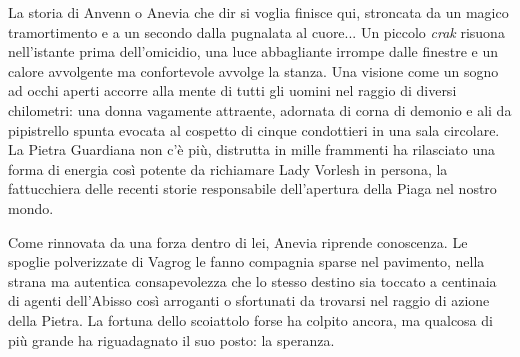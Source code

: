 La storia di Anvenn o Anevia che dir si voglia finisce qui, stroncata da un magico tramortimento e a un secondo dalla pugnalata al cuore... Un piccolo \emph{crak} risuona nell'istante prima dell'omicidio, una luce abbagliante irrompe dalle finestre e un calore avvolgente ma confortevole avvolge la stanza. Una visione come un sogno ad occhi aperti accorre alla mente di tutti gli uomini nel raggio di diversi chilometri: una donna vagamente attraente, adornata di corna di demonio e ali da pipistrello spunta evocata al cospetto di cinque condottieri in una sala circolare. La Pietra Guardiana non c'\`e pi\`u, distrutta in mille frammenti ha rilasciato una forma di energia cos\`i potente da richiamare Lady Vorlesh in persona, la fattucchiera delle recenti storie responsabile dell'apertura della Piaga nel nostro mondo. 

Come rinnovata da una forza dentro di lei, Anevia riprende conoscenza. Le spoglie polverizzate di Vagrog le fanno compagnia sparse nel pavimento, nella strana ma autentica consapevolezza che lo stesso destino sia toccato a centinaia di agenti dell'Abisso cos\`i arroganti o sfortunati da trovarsi nel raggio di azione della Pietra. La fortuna dello scoiattolo forse ha colpito ancora, ma qualcosa di pi\`u grande ha riguadagnato il suo posto: la speranza.